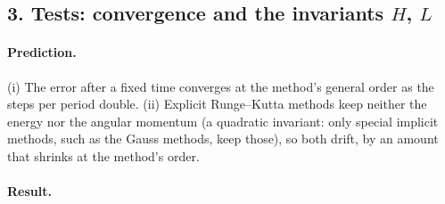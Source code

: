 \documentclass[11pt,a4paper]{article}
\begin{document}
\newpage
\subsection*{3. Tests: convergence and the invariants $H$, $L$}

\paragraph{Prediction.} (i) The error after a fixed time converges at the
method's general order as the steps per period double. (ii) Explicit
Runge--Kutta methods keep neither the energy nor the angular momentum (a
quadratic invariant: only special implicit methods, such as the Gauss
methods, keep those), so both drift, by an amount that shrinks at the
method's order.

\paragraph{Result.}
\begin{center}
\small

\end{center}
\end{document}
